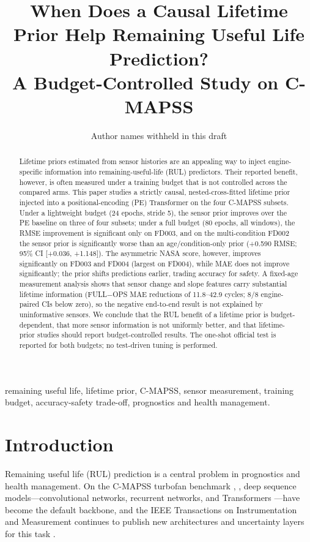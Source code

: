 \documentclass[journal]{IEEEtran}
\begin{document}
\title{When Does a Causal Lifetime Prior Help Remaining Useful Life Prediction?\\ A Budget-Controlled Study on C-MAPSS}
\author{Author names withheld in this draft}
\maketitle
\begin{abstract}
Lifetime priors estimated from sensor histories are an appealing way to inject engine-specific information into remaining-useful-life (RUL) predictors. Their reported benefit, however, is often measured under a training budget that is not controlled across the compared arms. This paper studies a strictly causal, nested-cross-fitted lifetime prior injected into a positional-encoding (PE) Transformer on the four C-MAPSS subsets. Under a lightweight budget (24 epochs, stride 5), the sensor prior improves over the PE baseline on three of four subsets; under a full budget (80 epochs, all windows), the RMSE improvement is significant only on FD003, and on the multi-condition FD002 the sensor prior is significantly worse than an age/condition-only prior (+0.590 RMSE; 95\% CI [+0.036, +1.148]). The asymmetric NASA score, however, improves significantly on FD003 and FD004 (largest on FD004), while MAE does not improve significantly; the prior shifts predictions earlier, trading accuracy for safety. A fixed-age measurement analysis shows that sensor change and slope features carry substantial lifetime information (FULL$-$OPS MAE reductions of 11.8--42.9 cycles; 8/8 engine-paired CIs below zero), so the negative end-to-end result is not explained by uninformative sensors. We conclude that the RUL benefit of a lifetime prior is budget-dependent, that more sensor information is not uniformly better, and that lifetime-prior studies should report budget-controlled results. The one-shot official test is reported for both budgets; no test-driven tuning is performed.
\end{abstract}
\begin{IEEEkeywords}
remaining useful life, lifetime prior, C-MAPSS, sensor measurement, training budget, accuracy-safety trade-off, prognostics and health management.
\end{IEEEkeywords}
\section{Introduction}
Remaining useful life (RUL) prediction is a central problem in prognostics and health management. On the C-MAPSS turbofan benchmark \cite{ref1}, \cite{ref2}, deep sequence models---convolutional networks, recurrent networks, and Transformers \cite{ref11}---have become the default backbone, and the IEEE Transactions on Instrumentation and Measurement continues to publish new architectures and uncertainty layers for this task \cite{ref3,ref4,ref5,ref6,ref7,ref8,ref9,ref10}.
\end{document}
